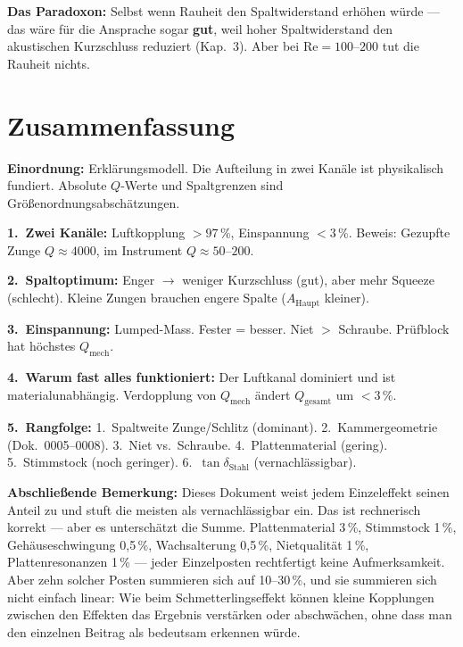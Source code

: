 \documentclass[11pt,a4paper]{article}
\begin{document}
\textbf{Das Paradoxon:} Selbst wenn Rauheit den Spaltwiderstand erhöhen würde --- das wäre für die Ansprache sogar \textbf{gut}, weil hoher Spaltwiderstand den akustischen Kurzschluss reduziert (Kap.~3). Aber bei $\text{Re} = 100$--$200$ tut die Rauheit nichts.

\section{Zusammenfassung}

\begin{warnbox}
\textbf{Einordnung:} Erklärungsmodell. Die Aufteilung in zwei Kanäle ist physikalisch fundiert. Absolute $Q$-Werte und Spaltgrenzen sind Größenordnungsabschätzungen.
\end{warnbox}

\begin{keybox}
\textbf{1.\ Zwei Kanäle:} Luftkopplung $> 97\,\%$, Einspannung $< 3\,\%$. Beweis: Gezupfte Zunge $Q \approx 4000$, im Instrument $Q \approx 50$--$200$.

\textbf{2.\ Spaltoptimum:} Enger $\to$ weniger Kurzschluss (gut), aber mehr Squeeze (schlecht). Kleine Zungen brauchen engere Spalte ($A_\text{Haupt}$ kleiner).

\textbf{3.\ Einspannung:} Lumped-Mass. Fester = besser. Niet $>$ Schraube. Prüfblock hat höchstes $Q_\text{mech}$.

\textbf{4.\ Warum fast alles funktioniert:} Der Luftkanal dominiert und ist materialunabhängig. Verdopplung von $Q_\text{mech}$ ändert $Q_\text{gesamt}$ um $< 3\,\%$.

\textbf{5.\ Rangfolge:} 1.~Spaltweite Zunge/Schlitz (dominant). 2.~Kammergeometrie (Dok.~0005--0008). 3.~Niet vs.\ Schraube. 4.~Plattenmaterial (gering). 5.~Stimmstock (noch geringer). 6.~$\tan\delta_\text{Stahl}$ (vernachlässigbar).
\end{keybox}

\vspace{4mm}
\textbf{Abschließende Bemerkung:} Dieses Dokument weist jedem Einzeleffekt seinen Anteil zu und stuft die meisten als vernachlässigbar ein. Das ist rechnerisch korrekt --- aber es unterschätzt die Summe. Plattenmaterial 3\,\%, Stimmstock 1\,\%, Gehäuseschwingung 0,5\,\%, Wachsalterung 0,5\,\%, Nietqualität 1\,\%, Plattenresonanzen 1\,\% --- jeder Einzelposten rechtfertigt keine Aufmerksamkeit. Aber zehn solcher Posten summieren sich auf 10--30\,\%, und sie summieren sich nicht einfach linear: Wie beim Schmetterlingseffekt können kleine Kopplungen zwischen den Effekten das Ergebnis verstärken oder abschwächen, ohne dass man den einzelnen Beitrag als bedeutsam erkennen würde.
\end{document}
